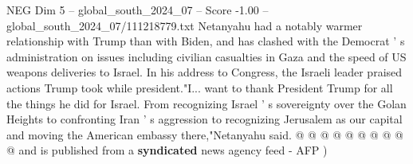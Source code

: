 \begin{textsample}{NEG Dim 5 – global\_south\_2024\_07 – Score -1.00 – global\_south\_2024\_07/111218779.txt}
Netanyahu had a notably warmer relationship with Trump than with Biden, and has clashed with the Democrat ' s administration on issues including civilian casualties in Gaza and the speed of US weapons deliveries to Israel.
In his address to Congress, the Israeli leader praised actions Trump took while president."I... want to thank President Trump for all the things he did for Israel.
From recognizing Israel ' s sovereignty over the Golan Heights to confronting Iran ' s aggression to recognizing Jerusalem as our capital and moving the American embassy there,"Netanyahu said. @ @ @ @ @ @ @ @ @ @ and is published from a \textbf{syndicated} news agency feed - AFP )

\end{textsample}
